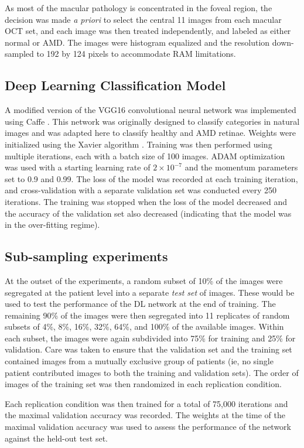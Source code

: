 As most of the macular pathology is concentrated in the foveal region, the
decision was made \emph{a priori} to select the central 11 images from each
macular OCT set, and each image was then treated independently, and labeled as
either normal or AMD. The images were histogram equalized and the resolution
down-sampled to 192 by 124 pixels to accommodate RAM limitations.

\subsection{Deep Learning Classification Model}

A modified version of the VGG16 convolutional neural network
\cite{Simonyan2014-al} was implemented using Caffe \cite{jia2014caffe}. This
network was originally designed to classify categories in natural images and was
adapted here to classify healthy and AMD retinae. Weights were initialized using
the Xavier algorithm \cite{Glorot2010-is}. Training was then performed using
multiple iterations, each with a batch size of 100 images. ADAM optimization
\cite{Kingma2014-jl} was used with a starting learning rate of $2 \times
10^{-7}$ and the momentum parameters set to 0.9 and 0.99. The loss of the model
was recorded at each training iteration, and cross-validation with a separate
validation set was conducted every 250 iterations. The training was stopped when
the loss of the model decreased and the accuracy of the validation set
also decreased (indicating that the model was in the over-fitting regime).

\subsection{Sub-sampling experiments}

At the outset of the experiments, a random subset of 10\% of the images were
segregated at the patient level into a separate \emph{test set} of images. These
would be used to test the performance of the DL network at the end of training.
The remaining 90\% of the images were then segregated into 11 replicates of
random subsets of 4\%, 8\%, 16\%, 32\%, 64\%, and 100\% of the available images.
Within each subset, the images were again subdivided into 75\% for training and
25\% for validation. Care was taken to ensure that the validation set and the
training set contained images from a mutually exclusive group of patients (ie,
no single patient contributed images to both the training and validation sets).
The order of images of the training set was then randomized in each replication
condition.

Each replication condition was then trained for a total of 75,000 iterations
and the maximal validation accuracy was recorded. The weights at the time of
the maximal validation accuracy was used to assess the performance of the
network against the held-out test set.
